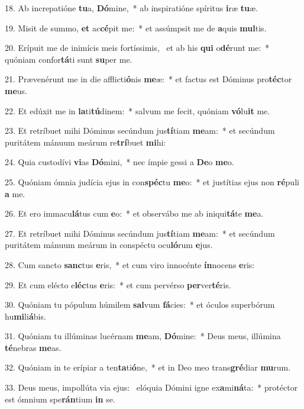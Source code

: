 18. Ab increpatióne \textbf{tu}a, \textbf{Dó}mine,~*  ab inspiratióne spíritus \textbf{i}ræ \textbf{tu}æ.\

19. Misit de summo, \textbf{et} ac\textbf{cé}pit me:~*  et assúmpsit me de \textbf{a}quis \textbf{mul}tis.\

20. Erípuit me de inimícis meis fortíssimis, \dag\  et ab his \textbf{qui} o\textbf{dé}runt me:~*  quóniam confor\textbf{tá}ti sunt \textbf{su}per me.\

21. Prævenérunt me in die afflicti\textbf{ó}nis \textbf{me}æ:~*  et factus est Dóminus pro\textbf{téc}tor \textbf{me}us.\

22. Et edúxit me in \textbf{la}ti\textbf{tú}dinem:~*  salvum me fecit, quóniam \textbf{vó}lu\textbf{it} me.\

23. Et retríbuet mihi Dóminus secúndum jus\textbf{tí}tiam \textbf{me}am:~*  et secúndum puritátem mánuum meárum re\textbf{trí}buet \textbf{mi}hi:\

24. Quia custodívi \textbf{vi}as \textbf{Dó}mini,~*  nec ímpie gessi a \textbf{De}o \textbf{me}o.\

25. Quóniam ómnia judícia ejus in con\textbf{spéc}tu \textbf{me}o:~*  et justítias ejus non \textbf{ré}puli \textbf{a} me.\

26. Et ero immacu\textbf{lá}tus cum \textbf{e}o:~*  et observábo me ab iniqui\textbf{tá}te \textbf{me}a.\

27. Et retríbuet mihi Dóminus secúndum jus\textbf{tí}tiam \textbf{me}am:~*  et secúndum puritátem mánuum meárum in conspéctu ocu\textbf{ló}rum \textbf{e}jus.\

28. Cum sancto \textbf{sanc}tus \textbf{e}ris,~*  et cum viro innocénte \textbf{ín}nocens \textbf{e}ris:\

29. Et cum elécto e\textbf{léc}tus \textbf{e}ris:~*  et cum pervérso \textbf{per}ver\textbf{té}ris.\

30. Quóniam tu pópulum húmilem \textbf{sal}vum \textbf{fá}cies:~*  et óculos superbórum hu\textbf{mi}li\textbf{á}bis.\

31. Quóniam tu illúminas lucérnam \textbf{me}am, \textbf{Dó}mine:~*  Deus meus, illúmina \textbf{té}nebras \textbf{me}as.\

32. Quóniam in te erípiar a ten\textbf{ta}ti\textbf{ó}ne,~*  et in Deo meo trans\textbf{gré}diar \textbf{mu}rum.\

33. Deus meus, impollúta via ejus: \dag\  elóquia Dómini igne ex\textbf{a}mi\textbf{ná}ta:~*  protéctor est ómnium spe\textbf{rán}tium \textbf{in} se.\

